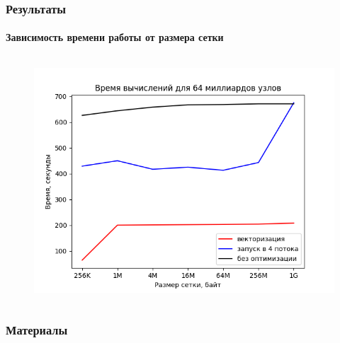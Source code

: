 \documentclass[presentation,18pt]{beamer}
\begin{document}
\begin{frame}
	\label{conclusion}
	\frametitle{Результаты}
	\framesubtitle{Зависимость времени работы от размера сетки}

	\begin{columns}


		\begin{block}{}
			\begin{figure}
				\includegraphics[width=\textwidth]{img/GraphFinal.png}
			\end{figure}
		\end{block}


	\end{columns}
\end{frame}

\begin{frame}
	\label{materials}
	\frametitle{Материалы}
\end{frame}
\end{document}
